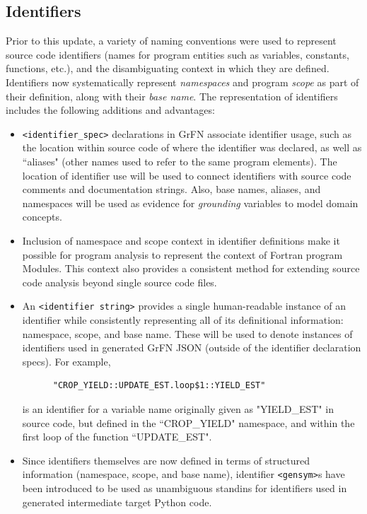 \documentclass[article, 12pt, oneside]{memoir}
\begin{document}
\hypertarget{identifiers}{%
\subsection{Identifiers}\label{identifiers}}

Prior to this update, a variety of naming conventions were used to
represent source code identifiers (names for program entities such as
variables, constants, functions, etc.), and the disambiguating context
in which they are defined. Identifiers now systematically represent
\emph{namespaces} and program \emph{scope} as part of their definition,
along with their \emph{base name}. The representation of identifiers
includes the following additions and advantages:

\begin{itemize}
\item
  \texttt{\textless{}identifier\_spec\textgreater{}} declarations in
  GrFN associate identifier usage, such as the location within source
  code of where the identifier was declared, as well as ``aliases" (other
  names used to refer to the same program elements). The location of
  identifier use will be used to connect identifiers with source code
  comments and documentation strings. Also, base names, aliases, and
  namespaces will be used as evidence for \emph{grounding} variables to
  model domain concepts.
\item
  Inclusion of namespace and scope context in identifier definitions
  make it possible for program analysis to represent the context of
  Fortran program Modules. This context also provides a consistent
  method for extending source code analysis beyond single source code
  files.
\item
  An \texttt{\textless{}identifier\ string\textgreater{}} provides a
  single human-readable instance of an identifier while consistently
  representing all of its definitional information: namespace, scope,
  and base name. These will be used to denote instances of identifiers
  used in generated GrFN JSON (outside of the identifier declaration
  specs). For example,
\begin{verbatim}
      "CROP_YIELD::UPDATE_EST.loop$1::YIELD_EST"
\end{verbatim}
  is an identifier for a variable name originally given as "YIELD\_EST"
  in source code, but defined in the ``CROP\_YIELD" namespace, and within
  the first loop of the function ``UPDATE\_EST".
\item
  Since identifiers themselves are now defined in terms of structured
  information (namespace, scope, and base name), identifier
  \texttt{\textless{}gensym\textgreater{}}s have been introduced to be
  used as unambiguous standins for identifiers used in generated
  intermediate target Python code.
\end{itemize}
\end{document}
